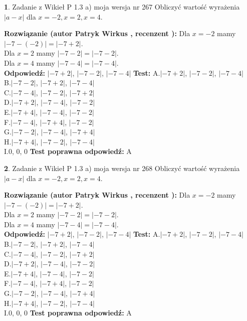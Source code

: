 \documentclass[12pt, a4paper]{article}
\theoremstyle{definition} %
\newtheorem{zad}{}
\newcommand{\zadStart}[1]{\begin{zad}#1\newline}
\newcommand{\zadStop}{\end{zad}}
\newcommand{\rozwStart}[2]{\noindent \textbf{Rozwiązanie (autor #1 , recenzent #2): }\newline}
\newcommand{\rozwStop}{\newline}
\newcommand{\odpStart}{\noindent \textbf{Odpowiedź:}\newline}
\newcommand{\odpStop}{\newline}
\newcommand{\testStart}{\noindent \textbf{Test:}\newline}
\newcommand{\testStop}{\newline}
\newcommand{\kluczStart}{\noindent \textbf{Test poprawna odpowiedź:}\newline}
\newcommand{\kluczStop}{\newline}
\begin{document}
\zadStart{Zadanie z Wikieł P 1.3 a) moja wersja nr 267}
Obliczyć wartość wyrażenia $|a - x|$ dla $x=-2,x=2,x=4$.
\zadStop
\rozwStart{Patryk Wirkus}{}
Dla $x = -2$ mamy $|-7 - (-2)| = |-7 + 2|$.\\
Dla $x = 2$ mamy $|-7 - 2| = |-7 - 2|$.\\
Dla $x = 4$ mamy $|-7 - 4| = |-7 - 4|$.\\
\rozwStop
\odpStart
$|-7 + 2|$, $|-7 - 2|$, $|-7 - 4|$
\odpStop
\testStart
A.$|-7 + 2|$, $|-7 - 2|$, $|-7 - 4|$\\
B.$|-7 - 2|$, $|-7 + 2|$, $|-7 - 4|$\\
C.$|-7 - 4|$, $|-7 - 2|$, $|-7 + 2|$\\
D.$|-7 + 2|$, $|-7 - 4|$, $|-7 - 2|$\\
E.$|-7 + 4|$, $|-7 - 4|$, $|-7 - 2|$\\
F.$|-7 - 4|$, $|-7 + 4|$, $|-7 - 2|$\\
G.$|-7 - 2|$, $|-7 - 4|$, $|-7 + 4|$\\
H.$|-7 + 4|$, $|-7 - 2|$, $|-7 - 4|$\\
I.$0$, $0$, $0$
\testStop
\kluczStart
A
\kluczStop



\zadStart{Zadanie z Wikieł P 1.3 a) moja wersja nr 268}
Obliczyć wartość wyrażenia $|a - x|$ dla $x=-2,x=2,x=4$.
\zadStop
\rozwStart{Patryk Wirkus}{}
Dla $x = -2$ mamy $|-7 - (-2)| = |-7 + 2|$.\\
Dla $x = 2$ mamy $|-7 - 2| = |-7 - 2|$.\\
Dla $x = 4$ mamy $|-7 - 4| = |-7 - 4|$.\\
\rozwStop
\odpStart
$|-7 + 2|$, $|-7 - 2|$, $|-7 - 4|$
\odpStop
\testStart
A.$|-7 + 2|$, $|-7 - 2|$, $|-7 - 4|$\\
B.$|-7 - 2|$, $|-7 + 2|$, $|-7 - 4|$\\
C.$|-7 - 4|$, $|-7 - 2|$, $|-7 + 2|$\\
D.$|-7 + 2|$, $|-7 - 4|$, $|-7 - 2|$\\
E.$|-7 + 4|$, $|-7 - 4|$, $|-7 - 2|$\\
F.$|-7 - 4|$, $|-7 + 4|$, $|-7 - 2|$\\
G.$|-7 - 2|$, $|-7 - 4|$, $|-7 + 4|$\\
H.$|-7 + 4|$, $|-7 - 2|$, $|-7 - 4|$\\
I.$0$, $0$, $0$
\testStop
\kluczStart
A
\kluczStop
\end{document}
